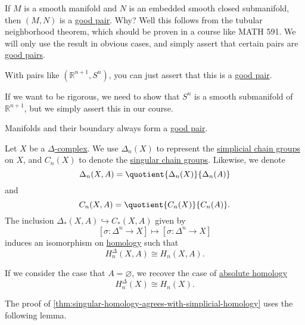 \begin{remark}
	If \(M\) is a smooth manifold and \(N\) is an embedded smooth closed submanifold, then \((M, N)\) is a \hyperref[def:good-pair]{good pair}. Why? Well this follows from the tubular neighborhood theorem, which should be proven in a course like MATH 591. We will only use the result in obvious cases, and simply assert that certain pairs are \hyperref[def:good-pair]{good pairs}.
\end{remark}

\begin{eg}
	With pairs like \((\mathbb{R}^{n + 1}, S^n)\), you can just assert that this is a \hyperref[def:good-pair]{good pair}.
\end{eg}
\begin{explanation}
	If we want to be rigorous, we need to show that \(S^n\) is a smooth submanifold of \(\mathbb{R}^{n + 1}\), but we simply assert this in our course.
\end{explanation}

\begin{eg}
	Manifolds and their boundary always form a \hyperref[def:good-pair]{good pair}.
\end{eg}

\begin{theorem}\label{thm:singular-homology-agrees-with-simplicial-homology}
	Let \(X\) be a \hyperref[def:delta-complex]{\(\Delta\)-complex}. We use \(\Delta_n(X)\) to represent the \hyperref[def:simplicial-complex]{simplicial chain groups} on \(X\), and \(C_n(X)\) to denote the \hyperref[def:singular-chain-group]{singular chain groups}. Likewise, we denote
	\[
		\Delta_n(X, A) = \quotient{\Delta_n(X)}{\Delta_n(A)}
	\]
	and
	\[
		C_n(X, A) = \quotient{C_n(X)}{C_n(A)}.
	\]
	The inclusion \(\Delta_\ast(X, A) \hookrightarrow C_\ast(X, A)\) given by
	\[
		[\sigma \colon \Delta^n \to X] \mapsto [\sigma : \Delta^n \to X]
	\]
	induces an isomorphism on \hyperref[def:homology-group]{homology} such that
	\[
		H_n^\Delta(X, A) \cong H_n(X, A).
	\]

	If we consider the case that \(A = \varnothing\), we recover the case of \hyperref[def:homology-group]{absolute homology}
	\[
		H_n^\Delta(X) \cong H_n(X).
	\]
\end{theorem}

The proof of \autoref{thm:singular-homology-agrees-with-simplicial-homology} uses the following lemma.

